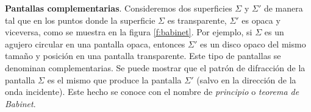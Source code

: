 %
%
\begin{minipage}[t]{.5\textwidth}
  \textbf{Pantallas complementarias}. Consideremos dos superficies $\Sigma$ y $\Sigma'$ de manera tal que en los puntos donde la superficie $\Sigma$ es transparente, $\Sigma'$ es opaca y viceversa, como se muestra en la figura \ref{f:babinet}. Por ejemplo, si $\Sigma$ es un agujero circular en una pantalla opaca, entonces $\Sigma'$ es un disco opaco del mismo tamaño y posición en una pantalla transparente. Este tipo de pantallas se denominan complementarias. Se puede mostrar que el patrón de difracción de la pantalla $\Sigma$ es el mismo que produce la pantalla $\Sigma'$ (salvo en la dirección de la onda incidente). Este hecho se conoce con el nombre de \textit{principio} o \textit{teorema de Babinet}.
\end{minipage}
\hfill

